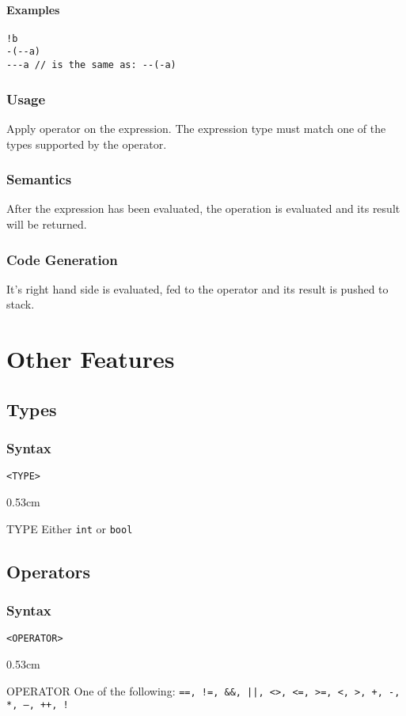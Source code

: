 \documentclass[twoside]{report}
\newenvironment{mycompactdesc}{\begin{adjustwidth}{0.53cm}{}\begin{compactdesc}}{\end{compactdesc}\end{adjustwidth}}
\begin{document}
\paragraph{Examples}
\begin{verbatim}
!b
-(--a)
---a // is the same as: --(-a)
\end{verbatim}
\subsubsection*{Usage}
Apply operator on the expression. The expression type must match one of the types supported by the operator.
\subsubsection*{Semantics}
After the expression has been evaluated, the operation is evaluated and its result will be returned.
\subsubsection*{Code Generation}
It's right hand side is evaluated, fed to the operator and its result is pushed to stack.


\section{Other Features}
\label{def:other_features}


\subsection{Types}
\label{def:types}
\subsubsection*{Syntax}
\texttt{<TYPE>}
\begin{mycompactdesc}
	\item[TYPE] Either \texttt{int} or \texttt{bool}
\end{mycompactdesc}


\subsection{Operators}
\label{def:operators}
\subsubsection*{Syntax}
\texttt{<OPERATOR>}
\begin{mycompactdesc}
	\item[OPERATOR] One of the following: \texttt{==, !=, \&\&, ||, <>, <=, >=, <, >, +, -, *, --, ++, !}
\end{mycompactdesc}
\end{document}
